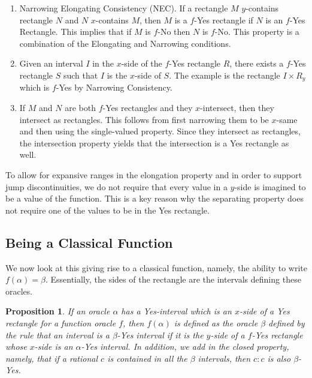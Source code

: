 \documentclass[12pt]{article}
\newtheorem{proposition}{Proposition}
\theoremstyle{remark}
\begin{document}
\begin{enumerate}
    \item Narrowing Elongating Consistency (NEC). If a rectangle $M$ $y$-contains rectangle $N$ and $N$ $x$-contains $M$, then $M$ is a $f$-Yes rectangle if $N$  is an $f$-Yes Rectangle. This implies that if $M$ is $f$-No then $N$ is $f$-No. This property is a combination of the Elongating and Narrowing conditions. 

    \item Given an interval $I$ in the $x$-side of the $f$-Yes rectangle $R$, there exists a $f$-Yes rectangle $S$ such that $I$ is the $x$-side of $S$. The example is the rectangle $I \times R_y$ which is $f$-Yes by Narrowing Consistency. 

    \item If $M$ and $N$ are both $f$-Yes rectangles and they $x$-intersect, then they intersect as rectangles. This follows from first narrowing them to be $x$-same and then using the single-valued property. Since they intersect as rectangles, the intersection property yields that the intersection is a Yes rectangle as well. 

\end{enumerate}

To allow for expansive ranges in the elongation property and in order to support jump discontinuities, we do not require that every value in a $y$-side is imagined to be a value of the function. This is a key reason why the separating property does not require one of the values to be in the Yes rectangle. 

\subsection{Being a Classical Function}

We now look at this giving rise to a classical function, namely, the ability to write $f(\alpha) = \beta$. Essentially, the sides of the rectangle are the intervals defining these oracles.  

\begin{proposition}
If an oracle $\alpha$ has a Yes-interval which is an $x$-side of a Yes rectangle for a function oracle $f$, then $f(\alpha)$ is defined as the oracle $\beta$ defined by the rule that an interval is a $\beta$-Yes interval if it is the $y$-side of a $f$-Yes rectangle whose $x$-side is an $\alpha$-Yes interval. In addition, we add in the closed property, namely, that if a rational $c$ is contained in all the $\beta$ intervals, then $c:c$ is also $\beta$-Yes.  
\end{proposition}
\end{document}

